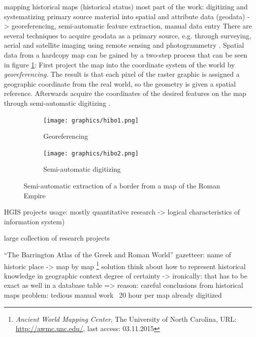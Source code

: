   mapping historical maps (historical status)
    most part of the work: digitizing and systematizing primary source material into spatial and attribute data (geodata)
    -> georeferencing, semi-automatic feature extraction, manual data entry
    \cite[pp. xvii]{knowles2002past}
    There are several techniques to acquire geodata as a primary source, e.g. through surveying, aerial and satellite imaging using remote sensing and photogrammetry
    \cite[p. 148-149, p. 213-216]{bolstad2008gis}.
    Spatial data from a hardcopy map can be gained by a two-step process that can be seen in figure \ref{fig:hibo}:
    First project the map into the coordinate system of the world by \emph{georeferencing}. The result is that each pixel of the raster graphic is assigned a geographic coordinate from the real world, so the geometry is given a spatial reference. Afterwards acquire the coordinates of the desired features on the map through semi-automatic digitizing
    \cite[p. 133-142]{bolstad2008gis}.

    \begin{figure}[ht]
      \centering
      \begin{subfigure}{0.48\textwidth}
        \centering
        \texttt{[image: graphics/hibo1.png]}
        \caption{Georeferencing}
      \end{subfigure}
      \begin{subfigure}{0.48\textwidth}
        \centering
        \texttt{[image: graphics/hibo2.png]}
        \caption{Semi-automatic digitizing}
      \end{subfigure}
      \caption{Semi-automatic extraction of a border from a map of the Roman Empire \protect\footnotemark}
      \label{fig:hibo}
    \end{figure}



HGIS projects
  usage: mostly quantitative research
  -> logical characteristics of information system)

  large collection of research projects
  \cite{knowles2008placing}
  \cite{gregory2014toward}

  ``The Barrington Atlas of the Greek and Roman World''
    gazetteer: name of historic place -> map by map
    \cite{talbert2000barrington}
    \footnote{
      \textit{Ancient World Mapping Center},
      The University of North Carolina,
      URL: \url{http://awmc.unc.edu/},
      last access: 03.11.2015
    }
  solution
    think about how to represent historical knowledge in geographic context
    degree of certainty -> ironically: that has to be exact as well in a database table
    => reason: careful conclusions from historical maps
  problem: tedious manual work
    ~20 hour per map already digitized
    \cite[pp. 145]{knowles2002past}

